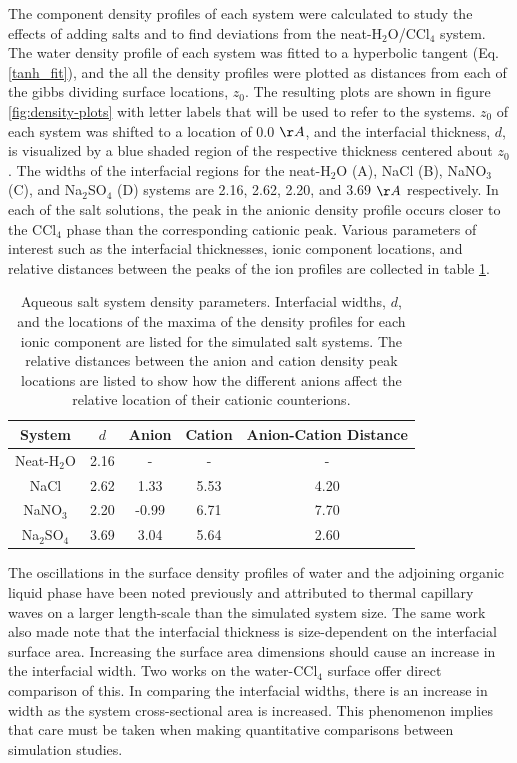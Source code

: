 The component density profiles of each system were calculated to study the effects of adding salts and to find deviations from the neat-H$_2$O/CCl$_4$ system. The water density profile of each system was fitted to a hyperbolic tangent (Eq. \ref{tanh_fit}), and the all the density profiles were plotted as distances from each of the gibbs dividing surface locations, $z_0$. The resulting plots are shown in figure \ref{fig:density-plots} with letter labels that will be used to refer to the systems. $z_0$ of each system was shifted to a location of 0.0 $\AA$, and the interfacial thickness, $d$, is visualized by a blue shaded region of the respective thickness centered about $z_0$. The widths of the interfacial regions for the neat-H$_2$O (A), NaCl (B), NaNO$_3$ (C), and Na$_2$SO$_4$ (D) systems are 2.16, 2.62, 2.20, and 3.69 $\AA$ respectively. In each of the salt solutions, the peak in the anionic density profile occurs closer to the CCl$_4$ phase than the corresponding cationic peak. Various parameters of interest such as the interfacial thicknesses, ionic component locations, and relative distances between the peaks of the ion profiles are collected in table \ref{system-params}.

\begin{table}[htdp]
	\begin{center}
	\begin{tabular}{|c||c|c|c|c|}
		\hline
		System & $d$ & Anion & Cation & Anion-Cation Distance \\ \hline
		Neat-H$_2$O & 2.16 & - & - & - \\ 
		NaCl & 2.62 & 1.33 & 5.53 & 4.20 \\
		NaNO$_3$ & 2.20 & -0.99 & 6.71 & 7.70 \\
		Na$_2$SO$_4$ & 3.69 & 3.04 & 5.64 & 2.60 \\
		\hline
	\end{tabular}
	\end{center}
	\caption{Aqueous salt system density parameters. Interfacial widths, $d$, and the locations of the maxima of the density profiles for each ionic component are listed for the simulated salt systems. The relative distances between the anion and cation density peak locations are listed to show how the different anions affect the relative location of their cationic counterions.}
	\label{system-params}
\end{table}

The oscillations in the surface density profiles of water and the adjoining organic liquid phase have been noted previously and attributed to thermal capillary waves on a larger length-scale than the simulated system size.\cite{Chang1996} The same work also made note that the interfacial thickness is size-dependent on the interfacial surface area. Increasing the surface area dimensions should cause an increase in the interfacial width. Two works on the water-CCl$_4$ surface offer direct comparison of this.\cite{Chang1996,Hore2008} In comparing the interfacial widths, there is an increase in width as the system cross-sectional area is increased. This phenomenon implies that care must be taken when making quantitative comparisons between simulation studies.

